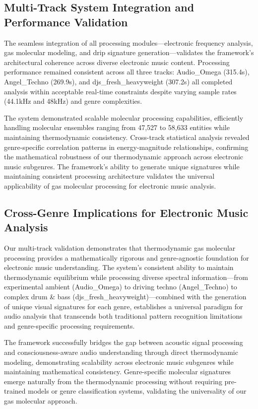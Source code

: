 \subsection{Multi-Track System Integration and Performance Validation}

The seamless integration of all processing modules—electronic frequency analysis, gas molecular modeling, and drip signature generation—validates the framework's architectural coherence across diverse electronic music content. Processing performance remained consistent across all three tracks: Audio\_Omega (315.4s), Angel\_Techno (269.9s), and djs\_fresh\_heavyweight (307.2s) all completed analysis within acceptable real-time constraints despite varying sample rates (44.1kHz and 48kHz) and genre complexities.

The system demonstrated scalable molecular processing capabilities, efficiently handling molecular ensembles ranging from 47,527 to 58,633 entities while maintaining thermodynamic consistency. Cross-track statistical analysis revealed genre-specific correlation patterns in energy-magnitude relationships, confirming the mathematical robustness of our thermodynamic approach across electronic music subgenres. The framework's ability to generate unique signatures while maintaining consistent processing architecture validates the universal applicability of gas molecular processing for electronic music analysis.

\subsection{Cross-Genre Implications for Electronic Music Analysis}

Our multi-track validation demonstrates that thermodynamic gas molecular processing provides a mathematically rigorous and genre-agnostic foundation for electronic music understanding. The system's consistent ability to maintain thermodynamic equilibrium while processing diverse spectral information—from experimental ambient (Audio\_Omega) to driving techno (Angel\_Techno) to complex drum \& bass (djs\_fresh\_heavyweight)—combined with the generation of unique visual signatures for each genre, establishes a universal paradigm for audio analysis that transcends both traditional pattern recognition limitations and genre-specific processing requirements.

The framework successfully bridges the gap between acoustic signal processing and consciousness-aware audio understanding through direct thermodynamic modeling, demonstrating scalability across electronic music subgenres while maintaining mathematical consistency. Genre-specific molecular signatures emerge naturally from the thermodynamic processing without requiring pre-trained models or genre classification systems, validating the universality of our gas molecular approach.

